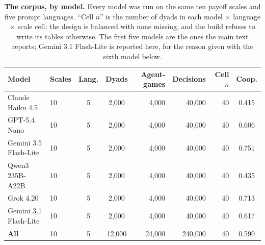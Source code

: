 \documentclass[11pt,a4paper]{article}
\begin{document}
\begin{table}[htbp]
\centering
\footnotesize
\setlength{\tabcolsep}{4pt}
\caption{\textbf{The corpus, by model.} Every model was run on the same ten payoff scales and five prompt languages. ``Cell $n$'' is the number of dyads in each model $\times$ language $\times$ scale cell; the design is balanced with none missing, and the build refuses to write its tables otherwise. The first five models are the ones the main text reports; Gemini 3.1 Flash-Lite is reported here, for the reason given with the sixth model below.}
\label{tab:S-corpus}
\begin{tabular}{@{}llccrrrc@{}}
\toprule
Model & Scales & Lang. & Dyads & Agent-games & Decisions & Cell $n$ & Coop. \\
\midrule
Claude Haiku 4.5 & 10 & 5 & 2,000 & 4,000 & 40,000 & 40 & 0.415 \\
GPT-5.4 Nano & 10 & 5 & 2,000 & 4,000 & 40,000 & 40 & 0.606 \\
Gemini 3.5 Flash-Lite & 10 & 5 & 2,000 & 4,000 & 40,000 & 40 & 0.751 \\
Qwen3 235B-A22B & 10 & 5 & 2,000 & 4,000 & 40,000 & 40 & 0.435 \\
Grok 4.20 & 10 & 5 & 2,000 & 4,000 & 40,000 & 40 & 0.713 \\
Gemini 3.1 Flash-Lite & 10 & 5 & 2,000 & 4,000 & 40,000 & 40 & 0.617 \\
\midrule
\textbf{All} & 10 & 5 & 12,000 & 24,000 & 240,000 & 40 & 0.590 \\
\bottomrule
\end{tabular}
\end{table}
\end{document}
